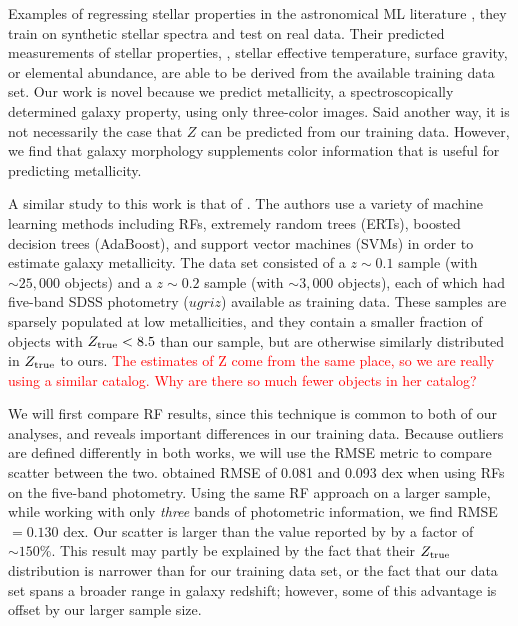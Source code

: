 \documentclass[fleqn,usenatbib]{mnras}
\newcommand{\editorial}[1]{\textcolor{red}{#1}}
\begin{document}
Examples of regressing stellar properties in the astronomical ML literature , they train on synthetic stellar spectra and test on real data. Their predicted measurements of stellar properties, \eg, stellar effective temperature, surface gravity, or elemental abundance, are able to be derived from the available training data set. Our work is novel because we predict metallicity, a spectroscopically determined galaxy property, using only three-color images. Said another way, it is not necessarily the case that $Z$ can be predicted from our training data. However, we find that galaxy morphology supplements color information that is useful for predicting metallicity.

A similar study to this work is that of \cite{Acquaviva2016}. The authors use a variety of machine learning methods including RFs, extremely random trees (ERTs), boosted decision trees (AdaBoost), and support vector machines (SVMs) in order to estimate galaxy metallicity. The \cite{Acquaviva2016} data set consisted of a $z \sim 0.1$ sample (with $\sim 25,000$ objects) and a $z \sim 0.2$ sample (with $\sim 3,000$ objects), each of which had five-band SDSS photometry ($ugriz$) available as training data. These samples are sparsely populated at low metallicities, and they contain a smaller fraction of objects with $Z_{\rm true} < 8.5$ than our sample, but are otherwise similarly distributed in $Z_{\rm true}$ to ours. \editorial{The estimates of Z come from the same place, so we are really using a similar catalog. Why are there so much fewer objects in her catalog?}

We will first compare RF results, since this technique is common to both of our analyses, and reveals important differences in our training data. Because outliers are defined differently in both works, we will use the RMSE metric to compare scatter between the two. \cite{Acquaviva2016} obtained RMSE of 0.081 and 0.093 dex when using RFs on the five-band photometry. Using the same RF approach on a larger sample, while working with only \textit{three} bands of photometric information, we find RMSE $= 0.130$ dex. Our scatter is larger than the value reported by \cite{Acquaviva2016} by a factor of $\sim 150\%$. This result may partly be explained by the fact that their $Z_{\rm true}$ distribution is narrower than for our training data set, or the fact that our data set spans a broader range in galaxy redshift; however, some of this advantage is offset by our larger sample size.
\end{document}
